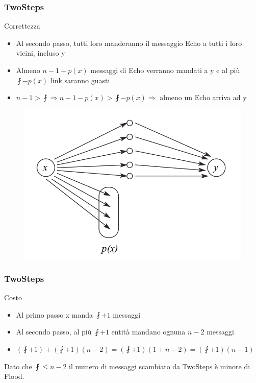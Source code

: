 		\begin{frame}
			\frametitle{TwoSteps}
			\begin{block}{Correttezza}
				\begin{itemize}
					\item Al secondo passo, tutti loro manderanno il messaggio Echo a tutti i loro vicini, incluso y
					\item Almeno $n - 1 - p(x)$ messaggi di Echo verranno mandati a y e al più $\fint - p(x)$ link saranno guasti
					\item $n-1 > \fint \Rightarrow n - 1 - p(x) > \fint - p(x) \Rightarrow$ almeno un Echo arriva ad y  
				\end{itemize}				
			\end{block}
			\begin{center}
				\begin{figure}
					\includegraphics[scale=0.32]{img/twoSteps}
				\end{figure}
			\end{center}
		\end{frame}
	
		\begin{frame}
			\frametitle{TwoSteps}
			\begin{block}{Costo}
				\begin{itemize}
					\item Al primo passo x manda $\fint+1$ messaggi
					\item Al secondo passo, al più $\fint+1$ entità mandano ognuna $n-2$ messaggi
					\item $(\fint+1)+(\fint+1)(n-2) = (\fint+1)(1 + n - 2) = (\fint+1)(n-1)$
				\end{itemize}			
			\end{block}
			Dato che $\fint \leq n-2$ il numero di messaggi scambiato da TwoSteps è minore di Flood.
		\end{frame}
	
